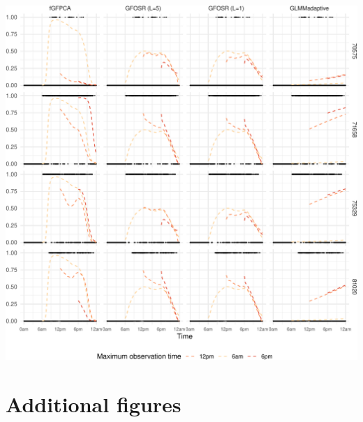 \documentclass[
]{article}
\begin{document}
\includegraphics{manuscript_files/figure-latex/fig_appl-1.pdf}

\hypertarget{additional-figures}{%
\section{Additional figures}\label{additional-figures}}
\end{document}
